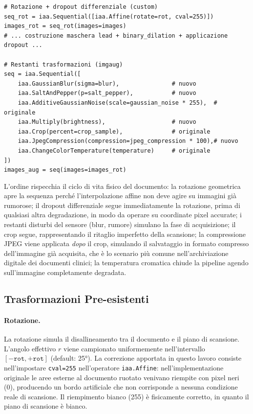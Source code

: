 \begin{verbatim}
# Rotazione + dropout differenziale (custom)
seq_rot = iaa.Sequential([iaa.Affine(rotate=rot, cval=255)])
images_rot = seq_rot(images=images)
# ... costruzione maschera lead + binary_dilation + applicazione dropout ...

# Restanti trasformazioni (imgaug)
seq = iaa.Sequential([
    iaa.GaussianBlur(sigma=blur),               # nuovo
    iaa.SaltAndPepper(p=salt_pepper),           # nuovo
    iaa.AdditiveGaussianNoise(scale=gaussian_noise * 255),  # originale
    iaa.Multiply(brightness),                   # nuovo
    iaa.Crop(percent=crop_sample),              # originale
    iaa.JpegCompression(compression=jpeg_compression * 100),# nuovo
    iaa.ChangeColorTemperature(temperature)     # originale
])
images_aug = seq(images=images_rot)
\end{verbatim}

L'ordine rispecchia il ciclo di vita fisico del documento: la rotazione geometrica apre la sequenza perché l'interpolazione affine non deve agire su immagini già rumorose; il dropout differenziale segue immediatamente la rotazione, prima di qualsiasi altra degradazione, in modo da operare su coordinate pixel accurate; i restanti disturbi del sensore (blur, rumore) simulano la fase di acquisizione; il crop segue, rappresentando il ritaglio imperfetto della scansione; la compressione JPEG viene applicata \textit{dopo} il crop, simulando il salvataggio in formato compresso dell'immagine già acquisita, che è lo scenario più comune nell'archiviazione digitale dei documenti clinici; la temperatura cromatica chiude la pipeline agendo sull'immagine completamente degradata.

\subsection{Trasformazioni Pre-esistenti}

\paragraph{Rotazione.} La rotazione simula il disallineamento tra il documento e il piano di scansione. L'angolo effettivo $r$ viene campionato uniformemente nell'intervallo $[-\texttt{rot}, +\texttt{rot}]$ (default: 25°). La correzione apportata in questo lavoro consiste nell'impostare \texttt{cval=255} nell'operatore \texttt{iaa.Affine}: nell'implementazione originale le aree esterne al documento ruotato venivano riempite con pixel neri (0), producendo un bordo artificiale che non corrisponde a nessuna condizione reale di scansione. Il riempimento bianco (255) è fisicamente corretto, in quanto il piano di scansione è bianco.

